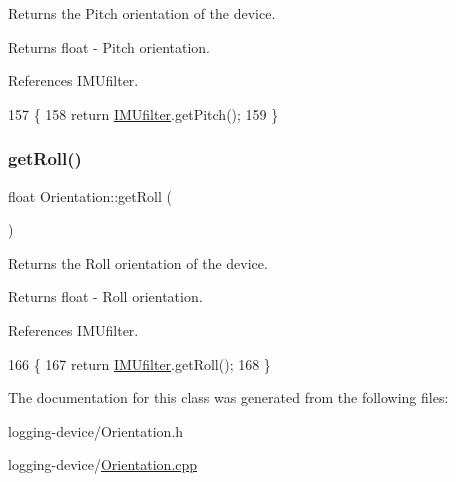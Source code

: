 Returns the Pitch orientation of the device. 

\begin{DoxyReturn}{Returns}
float -\/ Pitch orientation. 
\end{DoxyReturn}


References I\+M\+Ufilter.


\begin{DoxyCode}
157 \{
158   \textcolor{keywordflow}{return} \hyperlink{class_orientation_a3b0d70328334e69797438ccc408806c1}{IMUfilter}.getPitch();
159 \}
\end{DoxyCode}
\mbox{\label{class_orientation_ab8923432cb8c18822b0a9ae95a5ac505}} 
\subsubsection{\texorpdfstring{get\+Roll()}{getRoll()}}
{\footnotesize\ttfamily float Orientation\+::get\+Roll (\begin{DoxyParamCaption}{ }\end{DoxyParamCaption})}



Returns the Roll orientation of the device. 

\begin{DoxyReturn}{Returns}
float -\/ Roll orientation. 
\end{DoxyReturn}


References I\+M\+Ufilter.


\begin{DoxyCode}
166 \{
167   \textcolor{keywordflow}{return} \hyperlink{class_orientation_a3b0d70328334e69797438ccc408806c1}{IMUfilter}.getRoll();
168 \}
\end{DoxyCode}


The documentation for this class was generated from the following files\+:\begin{DoxyCompactItemize}
\item 
logging-\/device/Orientation.\+h\item 
logging-\/device/\hyperlink{_orientation_8cpp}{Orientation.\+cpp}\end{DoxyCompactItemize}
